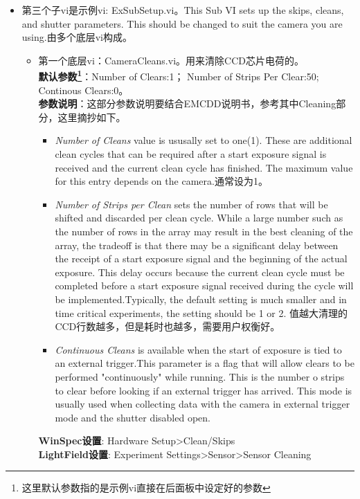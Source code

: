 \begin{itemize}
\item 第三个子vi是示例vi: ExSubSetup.vi。This Sub VI sets up the skips, cleans, and shutter parameters. This should be changed to suit the camera you are using.由多个底层vi构成。
\begin{itemize}
\item 第一个底层vi：CameraCleans.vi。用来清除CCD芯片电荷的。
\\ \textbf{默认参数\footnote{这里默认参数指的是示例vi直接在后面板中设定好的参数}}：Number of Clears:1； Number of Strips Per Clear:50;  Continous Clears:0。
\\ \textbf{参数说明}：这部分参数说明要结合EMCDD说明书，参考其中Cleaning部分，这里摘抄如下。
\begin{itemize}
\item \emph{Number of Cleans} value is ususally set to one(1). These are additional clean cycles that can be required after a start exposure signal is received and the current clean cycle has finished. The maximum value for this entry depends on the camera.通常设为1。
\item \emph{Number of Strips per Clean} sets the number of rows that will be shifted 
and discarded per clean cycle. While a large number such as the number of rows in the array may result in the best cleaning of the array, the tradeoff is that there may be a significant delay between the receipt of a start exposure signal and the beginning of the actual exposure. This delay occurs because the current clean cycle must be completed before a start exposure signal received during the cycle will be implemented.Typically, the default setting is much smaller and in time critical experiments, the setting should be 1 or 2. 值越大清理的CCD行数越多，但是耗时也越多，需要用户权衡好。
\item \emph{Continuous Cleans} is available when the start of exposure is tied to an external trigger.This parameter is a flag that will allow clears to be performed "continuously" while running. This is the number o strips to clear before looking if an external trigger has arrived. This mode is usually used when collecting data with the camera in external trigger mode and the shutter disabled open.
\end{itemize}
\textbf{WinSpec设置}: Hardware Setup>Clean/Skips
\\ \textbf{LightField设置}: Experiment Settings>Sensor>Sensor Cleaning


\end{itemize}
\end{itemize}
